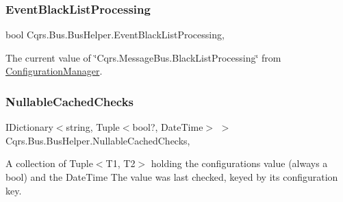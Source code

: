 \subsubsection{\texorpdfstring{Event\+Black\+List\+Processing}{EventBlackListProcessing}}
{\footnotesize\ttfamily bool Cqrs.\+Bus.\+Bus\+Helper.\+Event\+Black\+List\+Processing\hspace{0.3cm}{\ttfamily [get]}, {\ttfamily [protected]}}



The current value of \char`\"{}\+Cqrs.\+Message\+Bus.\+Black\+List\+Processing\char`\"{} from \hyperlink{classCqrs_1_1Bus_1_1BusHelper_aff0eaa0679d808e268ab4b5fb669bac8_aff0eaa0679d808e268ab4b5fb669bac8}{Configuration\+Manager}. 

\mbox{\label{classCqrs_1_1Bus_1_1BusHelper_aa5808a8927948e071c9aef24c89feb70_aa5808a8927948e071c9aef24c89feb70}} 
\subsubsection{\texorpdfstring{Nullable\+Cached\+Checks}{NullableCachedChecks}}
{\footnotesize\ttfamily I\+Dictionary$<$string, Tuple$<$bool?, Date\+Time$>$ $>$ Cqrs.\+Bus.\+Bus\+Helper.\+Nullable\+Cached\+Checks\hspace{0.3cm}{\ttfamily [get]}, {\ttfamily [protected]}}



A collection of Tuple$<$\+T1, T2$>$ holding the configurations value (always a bool) and the Date\+Time The value was last checked, keyed by it\textquotesingle{}s configuration key. 

